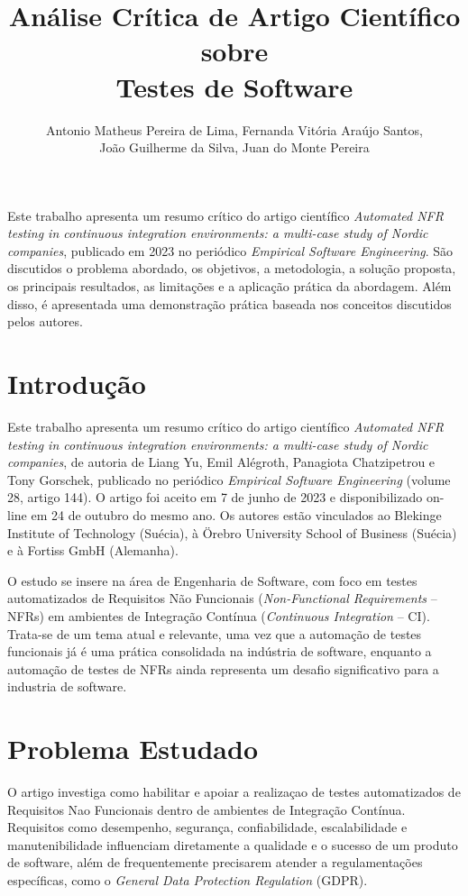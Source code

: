 \documentclass[12pt]{article}
\title{Análise Crítica de Artigo Científico sobre \\Testes de Software}
\author{Antonio Matheus Pereira de Lima\inst{1}, Fernanda Vitória Araújo Santos\inst{2},\\ João Guilherme da Silva\inst{3}, Juan do Monte Pereira\inst{4} }
\begin{document}
\maketitle

\begin{resumo}
    Este trabalho apresenta um resumo crítico do artigo científico \textit{Automated NFR testing in continuous integration environments: a multi-case study of Nordic companies}, publicado em 2023 no periódico \textit{Empirical Software Engineering}. São discutidos o problema abordado, os objetivos, a metodologia, a solução proposta, os principais resultados, as limitações e a aplicação prática da abordagem. Além disso, é apresentada uma demonstração prática baseada nos conceitos discutidos pelos autores.
\end{resumo}



\section{Introdução}

Este trabalho apresenta um resumo crítico do artigo científico \textit{Automated NFR testing in continuous integration environments: a multi-case study of Nordic companies}\nocite{yu2023automated}, de autoria de Liang Yu, Emil Alégroth, Panagiota Chatzipetrou e Tony Gorschek, publicado no periódico \textit{Empirical Software Engineering} (volume 28, artigo 144). O artigo foi aceito em 7 de junho de 2023 e disponibilizado on-line em 24 de outubro do mesmo ano. Os autores estão vinculados ao Blekinge Institute of Technology (Suécia), à Örebro University School of Business (Suécia) e à Fortiss GmbH (Alemanha).

O estudo se insere na área de Engenharia de Software, com foco em testes automatizados de Requisitos Não Funcionais (\textit{Non-Functional Requirements} -- NFRs) em ambientes de Integração Contínua (\textit{Continuous Integration} -- CI). Trata-se de um tema atual e relevante, uma vez que a automação de testes funcionais já é uma prática consolidada na indústria de software, enquanto a automação de testes de NFRs ainda representa um desafio significativo para a industria de software.

\section{Problema Estudado}

O artigo investiga como habilitar e apoiar a realizaçao de testes automatizados de Requisitos Nao Funcionais dentro de ambientes de Integração Contínua. Requisitos como desempenho, segurança, confiabilidade, escalabilidade e manutenibilidade influenciam diretamente a qualidade e o sucesso de um produto de software, além de frequentemente precisarem atender a regulamentações específicas, como o \textit{General Data Protection Regulation} (GDPR).
\end{document}
